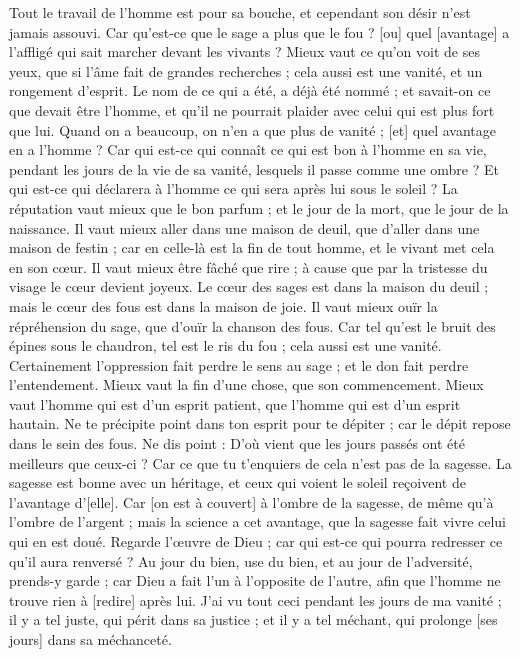\begin{multicols}{2}
Tout le travail de l'homme est pour sa bouche, et cependant son désir n'est jamais assouvi.
Car qu'est-ce que le sage a plus que le fou ? [ou] quel [avantage] a l'affligé qui sait marcher devant les vivants ?
Mieux vaut ce qu'on voit de ses yeux, que si l'âme fait de grandes recherches ; cela aussi est une vanité, et un rongement d'esprit.
Le nom de ce qui a été, a déjà été nommé ; et savait-on ce que devait être l'homme, et qu'il ne pourrait plaider avec celui qui est plus fort que lui.
Quand on a beaucoup, on n'en a que plus de vanité ; [et] quel avantage en a l'homme ?
Car qui est-ce qui connaît ce qui est bon à l'homme en sa vie, pendant les jours de la vie de sa vanité, lesquels il passe comme une ombre ? Et qui est-ce qui déclarera à l'homme ce qui sera après lui sous le soleil ?
\VerseOne{}La réputation vaut mieux que le bon parfum ; et le jour de la mort, que le jour de la naissance.
Il vaut mieux aller dans une maison de deuil, que d'aller dans une maison de festin ; car en celle-là est la fin de tout homme, et le vivant met cela en son cœur.
Il vaut mieux être fâché que rire ; à cause que par la tristesse du visage le cœur devient joyeux.
Le cœur des sages est dans la maison du deuil ; mais le cœur des fous est dans la maison de joie.
Il vaut mieux ouïr la répréhension du sage, que d'ouïr la chanson des fous.
Car tel qu'est le bruit des épines sous le chaudron, tel est le ris du fou ; cela aussi est une vanité.
Certainement l'oppression fait perdre le sens au sage ; et le don fait perdre l'entendement.
Mieux vaut la fin d'une chose, que son commencement. Mieux vaut l'homme qui est d'un esprit patient, que l'homme qui est d'un esprit hautain.
Ne te précipite point dans ton esprit pour te dépiter ; car le dépit repose dans le sein des fous.
Ne dis point : D'où vient que les jours passés ont été meilleurs que ceux-ci ? Car ce que tu t'enquiers de cela n'est pas de la sagesse.
La sagesse est bonne avec un héritage, et ceux qui voient le soleil reçoivent de l'avantage d'[elle].
Car [on est à couvert] à l'ombre de la sagesse, de même qu'à l'ombre de l'argent ; mais la science a cet avantage, que la sagesse fait vivre celui qui en est doué.
Regarde l'œuvre de Dieu ; car qui est-ce qui pourra redresser ce qu'il aura renversé ?
Au jour du bien, use du bien, et au jour de l'adversité, prends-y garde ; car Dieu a fait l'un à l'opposite de l'autre, afin que l'homme ne trouve rien à [redire] après lui.
J'ai vu tout ceci pendant les jours de ma vanité ; il y a tel juste, qui périt dans sa justice ; et il y a tel méchant, qui prolonge [ses jours] dans sa méchanceté.

\end{multicols}
